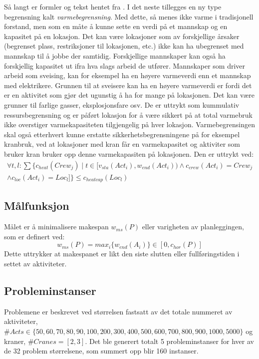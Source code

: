 Så langt er formler og tekst hentet fra \cite{tvedtbezem}. I det neste tillegges en ny type begrensning kalt \textit{varmebegrensning}. Med dette, så menes ikke varme i tradisjonell forstand, men som en måte å kunne sette en verdi på et mannskap og en kapasitet på en lokasjon. Det kan være lokasjoner som av forskjellige årsaker (begrenset plass, restriksjoner til lokasjonen, etc.) ikke kan ha ubegrenset med mannskap til å jobbe der samtidig. Forskjellige mannskaper kan også ha forskjellig kapasitet ut ifra hva slags arbeid de utfører. Mannskaper som driver arbeid som sveising, kan for eksempel ha en høyere varmeverdi enn et mannskap med elektrikere. Grunnen til at sveisere kan ha en høyere varmeverdi er fordi det er en aktivitet som gjør det ugunstig å ha for mange på lokasjonen. Det kan være grunner til farlige gasser, eksplosjonsfare osv. De er uttrykt som kummulativ ressursbegrensning og er påført lokasjon for å være sikkert på at total varmebruk ikke overstiger varmekapasiteten tilgjengelig på hver lokasjon. Varmebegrensingen skal også etterhvert kunne erstatte sikkerhetsbegrensningene på for eksempel kranbruk, ved at lokasjoner med kran får en varmekapasitet og aktiviter som bruker kran bruker opp denne varmekapasiten på lokasjonen. Den er uttrykt ved:
\begin{equation}
\begin{split}
\forall t,l: \sum\{c_{heat}(Crew_j) \mid t \in [ v_{sta}(Act_{i}), w_{end}(Act_{i})) \wedge c_{crew}(Act_{i}) = Crew_{j} \\
\wedge c_{loc}(Act_{i}) = Loc_{l} ] \} \le c_{heatcap}(Loc_{l})
\end{split}
\end{equation}

\subsection{Målfunksjon}
Målet er å minimalisere makespan $ w_{ms}(P) $ eller varigheten av planleggingen, som er definert ved:
\begin{equation}
w_{ms}(P) = max_{i} \{ w_{end}(A_{i}) \} \in [0,c_{hor}(P)]
\end{equation}
Dette uttrykker at makespanet er likt den siste slutten eller fullføringstiden i settet av aktiviteter.

\subsection{Probleminstanser}
Problemene er beskrevet ved størrelsen fastsatt av det totale nummeret av aktiviteter, $ \#Acts \in \{ 50,60, 70, 80, 90, 100, 200, 300, 400, 500, 600, 700, 800, 900, 1000, 5000 \} $ og kraner, $ \#Cranes = [2,3] $. Det ble generert totalt 5 probleminstanser for hver av de 32 problem størrelsene, som summert opp blir 160 instanser.

